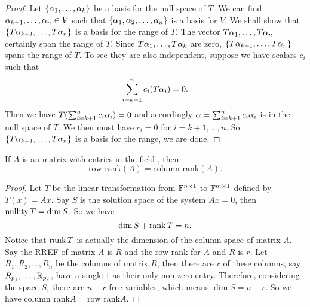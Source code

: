 \documentclass{mynotes}
\begin{document}
\begin{proof}
Let $\{\alpha_1,\ldots,\alpha_k\}$ be a basis for the null space of $T$. We can find $\alpha_{k+1},\ldots,\alpha_{n}\in V$ such that $\{\alpha_1,\alpha_2,\ldots,\alpha_n\}$ is a basis for $V$. We shall show that $\{T\alpha_{k+1},\ldots,T\alpha_n\}$ is a basis for the range of $T$. The vector $T\alpha_1,\ldots,T\alpha_n$ certainly span the range of $T$. Since $T\alpha_1,\ldots,T\alpha_k$ are zero, $\{T\alpha_{k+1},\ldots,T\alpha_n\}$ spans the range of $T$. To see they are also independent, suppose we have scalars $c_i$ such that $$\sum_{i=k+1}^n c_i(T\alpha_i) = 0.$$Then we have $T(\sum_{i=k+1}^n c_i\alpha_i) = 0$ and accordingly $\alpha = \sum_{i = k+1}^n c_i\alpha_i$ is in the null space of $T$. We then must have $c_i = 0$ for $i = k+1,\ldots, n$. So $\{T\alpha_{k+1},\ldots,T\alpha_n\}$ is a basis for the range, we are done.
\end{proof}
\begin{theorem}
If $A$ is an \mbyn{} matrix with entries in the field \F, then $$\mbox{row rank}(A) = \mbox{column rank}(A).$$
\end{theorem}
\begin{proof}
Let $T$ be the linear transformation from $\mathbb{F}^{n\times1}$ to $\mathbb{F}^{m\times1}$ defined by $T(x)=Ax$. Say $S$ is the solution space of the system $Ax=0$, then $\mathrm{nullity}\,{T} = \dim{S}$. So we have $$\dim{S}+\mathrm{rank}\,{T} = n.$$ Notice that $\mathrm{rank}\,{T}$ is actually the dimension of the column space of matrix $A$. Say the RREF of matrix $A$ is $R$ and the row rank for $A$ and $R$ is $r$. Let $R_1,R_2,\ldots,R_n$ be the columns of matrix $R$, then there are $r$ of these columns, say $R_{p_1},\ldots,\mathbb{R}_{p_r}$, have a single $1$ as their only non-zero entry. Therefore, considering the space $S$, there are $n-r$ free variables, which means $\dim{S} = n-r$. So we have $\mbox{column rank}{A}=\mbox{row rank}{A}$.
\end{proof}
\end{document}
